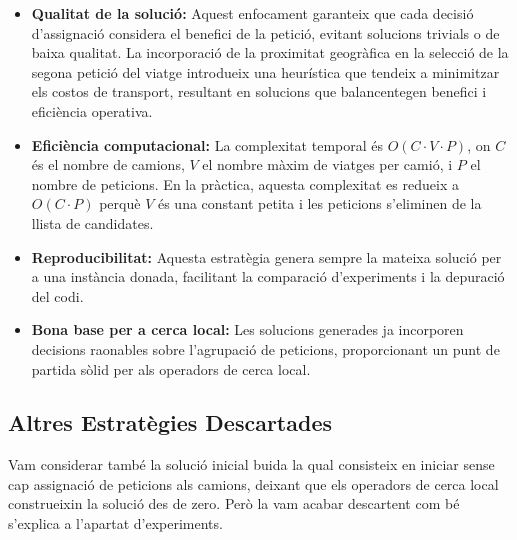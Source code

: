 \begin{itemize}
    \item \textbf{Qualitat de la solució:} Aquest enfocament garanteix que cada decisió d'assignació considera el benefici de la petició, evitant solucions trivials o de baixa qualitat. La incorporació de la proximitat geogràfica en la selecció de la segona petició del viatge introdueix una heurística que tendeix a minimitzar els costos de transport, resultant en solucions que balancentegen benefici i eficiència operativa.
    
    \item \textbf{Eficiència computacional:} La complexitat temporal és $O(C \cdot V \cdot P)$, on $C$ és el nombre de camions, $V$ el nombre màxim de viatges per camió, i $P$ el nombre de peticions. En la pràctica, aquesta complexitat es redueix a $O(C \cdot P)$ perquè $V$ és una constant petita i les peticions s'eliminen de la llista de candidates.
    
    \item \textbf{Reproducibilitat:} Aquesta estratègia genera sempre la mateixa solució per a una instància donada, facilitant la comparació d'experiments i la depuració del codi.
    
    \item \textbf{Bona base per a cerca local:} Les solucions generades ja incorporen decisions raonables sobre l'agrupació de peticions, proporcionant un punt de partida sòlid per als operadors de cerca local.
\end{itemize}

\vspace{0.5cm}

\subsection{Altres Estratègies Descartades}

Vam considerar també la solució inicial buida la qual consisteix en iniciar sense cap assignació de peticions als camions, deixant que els operadors de cerca local construeixin la solució des de zero. 
Però la vam acabar descartent com bé s'explica a l'apartat d'experiments.
